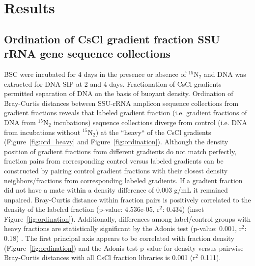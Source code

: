 \section{Results}
\subsection{Ordination of CsCl gradient fraction SSU {rRNA} gene sequence collections} 
BSC were incubated for 4 days in the presence or absence of $^{15}$N$_{2}$ and
DNA was extracted for DNA-SIP at 2 and 4 days. Fractionation of CsCl gradients
permitted separation of DNA on the basis of buoyant density. Ordination of
Bray-Curtis distances \citep{Bray_1957} between SSU-rRNA amplicon sequence
collections from gradient fractions reveals that labeled gradient fraction
(i.e. gradient fractions of DNA from $^{15}$N$_{2}$ incubations) sequence
collections diverge from control (i.e. DNA from incubations without
$^{15}$N$_{2}$) at the ``heavy`` of the CsCl gradients
(Figure~\ref{fig:ord_heavy} and Figure~\ref{fig:ordination}). Although the
density position of gradient fractions from different gradients do not match
perfectly, fraction pairs from corresponding control versus labeled gradients
can be constructed by pairing control gradient fractions with their closest
density neighbors/fractions from corresponding labeled gradients.  If a
gradient fraction did not have a mate within a density difference of 0.003 g/mL
it remained unpaired. Bray-Curtis distance within fraction pairs is
positively correlated to the density of the labeled fraction (p-value:
4.536e-05, r$^{2}$: 0.434) (inset Figure~\ref{fig:ordination}). Additionally,
differences among label/control groups with heavy fractions are statistically
significant by the Adonis test (p-value: 0.001, r$^{2}$: 0.18)
\citep{Anderson_2001}. The first principal axis appears to be correlated with
fraction density (Figure~\ref{fig:ordination}) and the Adonis test p-value for
density versus pairwise Bray-Curtis distances with all CsCl fraction libraries
is 0.001 (r$^{2}$ 0.111).

